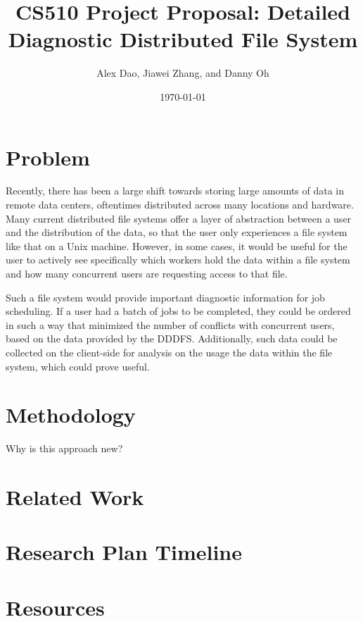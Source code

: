 \documentclass{article}
\title{CS510 Project Proposal: Detailed Diagnostic Distributed File System}
\date{\today}
\author{Alex Dao, Jiawei Zhang, and Danny Oh}
\begin{document}
\maketitle

\section{Problem}
Recently, there has been a large shift towards storing large amounts of data in remote data centers, oftentimes distributed across many locations and hardware. Many current distributed file systems offer a layer of abstraction between a user and the distribution of the data, so that the user only experiences a file system like that on a Unix machine. However, in some cases, it would be useful for the user to actively see specifically which workers hold the data within a file system and how many concurrent users are requesting access to that file. 

Such a file system would provide important diagnostic information for job scheduling. If a user had a batch of jobs to be completed, they could be ordered in such a way that minimized the number of conflicts with concurrent users, based on the data provided by the DDDFS. Additionally, such data could be collected on the client-side for analysis on the usage the data within the file system, which could prove useful.

\section{Methodology} 
Why is this approach new?

\section{Related Work}

\section{Research Plan Timeline}

\section{Resources}
\end{document}
